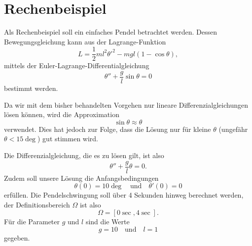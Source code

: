 %
%
%
%
\section{Rechenbeispiel\label{fem:rechenbsp}}

Als Rechenbeispiel soll ein einfaches Pendel betrachtet werden. 
Dessen Bewegungsgleichung kann aus der Lagrange-Funktion
\begin{equation}
    L = \frac{1}{2} m l^2 {\theta'}^2 - m g l (1 - \cos \theta),
\end{equation}
mittels der Euler-Lagrange-Differentialgleichung
\begin{equation}
    \theta'' + \frac{g}{l} \sin \theta = 0
\end{equation}
bestimmt werden.

Da wir mit dem bisher behandelten Vorgehen nur lineare Differenzialgleichungen lösen können, wird die Approximation
\begin{equation}
    \sin \theta \approx \theta
\end{equation}
verwendet.
Dies hat jedoch zur Folge, dass die Lösung nur für kleine $\theta$ (ungefähr $\theta < 15 \deg$) gut stimmen wird.

Die Differenzialgleichung, die es zu lösen gilt, ist also
\begin{equation}
    \theta'' + \frac{g}{l} \theta = 0.
\end{equation}
Zudem soll unsere Lösung die Anfangsbedingungen
\begin{equation}
    \theta(0) = 10 \deg
    \quad \text{und} \quad
    \theta'(0) = 0
\end{equation}
erfüllen.
Die Pendelschwingung soll über 4 Sekunden hinweg berechnet werden, der Definitionsbereich $\Omega$ ist also
\begin{equation}
    \Omega = [0\sec, 4\sec].
\end{equation}
Für die Parameter $g$ und $l$ sind die Werte
\begin{equation}
    g = 10
    \quad \text{und} \quad
    l = 1
\end{equation}
gegeben.


